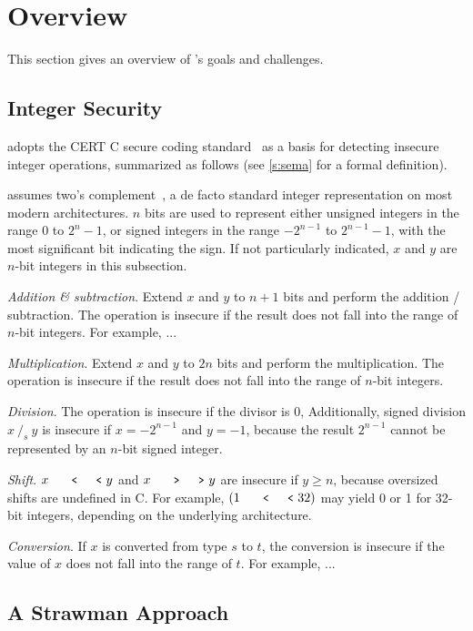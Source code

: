 \section{Overview}
\label{s:oview}

This section gives an overview of \sys's goals and challenges.

\subsection{Integer Security}

\sys adopts the CERT C secure coding
standard~\cite[Ch.~5]{seacord:secure-c} as a basis for detecting
insecure integer operations, summarized as follows (see \autoref{s:sema}
for a formal definition).

\sys assumes two's complement~\cite[Ch.~4.2.1]{intel:vol1}, a de
facto standard integer representation on most modern architectures.
$n$ bits are used to represent either unsigned integers in the range
$0$ to $2^n-1$, or signed integers in the range $-2^{n-1}$ to
$2^{n-1}-1$, with the most significant bit indicating the sign.  If
not particularly indicated, $x$ and $y$ are $n$-bit integers in
this subsection.

\noindent
{\it Addition \& subtraction}.
Extend $x$ and $y$ to $n+1$ bits and perform the addition / subtraction.
The operation is insecure if the result does not fall into the range of
$n$-bit integers.  For example, ...

\noindent
{\it Multiplication}.
Extend $x$ and $y$ to $2n$ bits and perform the multiplication.
The operation is insecure if the result does not fall
into the range of $n$-bit integers.

\noindent
{\it Division}.
The operation is insecure if the divisor is 0, Additionally, signed
division $x\ /_s\ y$ is insecure if $x = -2^{n-1}$ and $y = -1$,
because the result $2^{n-1}$ cannot be represented by an $n$-bit
signed integer.

\noindent
{\it Shift}. $x \shl y$ and $x \shr y$ are insecure if $y \geq n$,
because oversized shifts are undefined in C.  For example, $(1 \shl
32)$ may yield 0 or 1 for 32-bit integers, depending on the underlying
architecture.

\noindent
{\it Conversion}.
If $x$ is converted from type $s$ to $t$, the conversion is insecure
if the value of $x$ does not fall into the range of $t$.  For example,
...

\subsection{A Strawman Approach}

